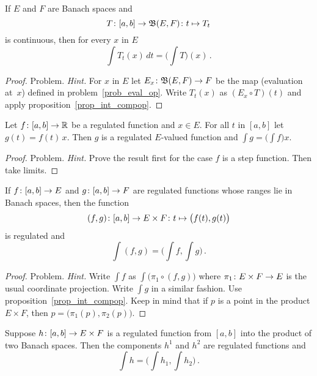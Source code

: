 \begin{cor}\label{cor_1param_fam}  If $E$ and $F$ are Banach spaces and
  \[ T\colon [a,b] \rightarrow \mathfrak{B}(E,F)\colon  t \mapsto T_t \]
is continuous, then for every $x$ in $E$
  \[ \int  T_t(x)\,dt = \biggl(\int T\biggr)(x)\,. \]
\end{cor}

\begin{proof} Problem.   \ns \emph{Hint.}  For $x$ in $E$ let $E_x\colon \mathfrak{B}(E,F) \rightarrow F$
be the map (evaluation at~$x$) defined in problem~\ref{prob_eval_op}.  Write $T_t(x)$ as $(E_x
\circ T)(t)$ and apply proposition~\ref{prop_int_compop}.
\end{proof}

\begin{prop}\label{prop_int_const_vec}  Let $f\colon [a,b] \rightarrow \mathbb{R}$ be a regulated function and
$x \in E$.  For all $t$ in $[a,b]$ let $g(t) = f(t)\,x$.  Then $g$ is a regulated $E$-valued
function and $\int g = \bigl(\int f\bigr)x$.
\end{prop}

\begin{proof} Problem.  \emph{Hint.}  Prove the result first for the case $f$ is a step function.
Then take limits.
\end{proof}

\begin{prop}  If $f\colon [a,b] \rightarrow E$ and $g\colon [a,b] \rightarrow F$ are regulated functions whose
ranges lie in Banach spaces, then the function
  \[ (f,g)\colon [a,b] \rightarrow E \times F\colon  t \mapsto \bigl(f(t),g(t)\bigr) \]
is regulated and
  \[ \int (f,g) = \biggl(\int f, \int g\biggr)\,. \]
\end{prop}

\begin{proof} Problem. \emph{Hint.} Write $\int f$ as $\int \bigl(\pi_1\circ(f,g)\bigr)$ where
$\pi_1\colon E \times F \rightarrow E$ is the usual coordinate projection.  Write $\int g$ in a
similar fashion. Use proposition~\ref{prop_int_compop}.  Keep in mind that if $p$ is a point
in the product $E \times F$, then $p = \bigl(\pi_1(p),\pi_2(p)\bigr)$.  \ns
\end{proof}

\begin{prop}  Suppose $h\colon [a,b] \rightarrow E \times F$ is a regulated function from $[a,b]$ into the
product of two Banach spaces.  Then the components $h^1$ and $h^2$ are regulated functions and
  \[ \int h = \biggl(\int h_1, \int h_2\biggr)\,. \]
\end{prop}

